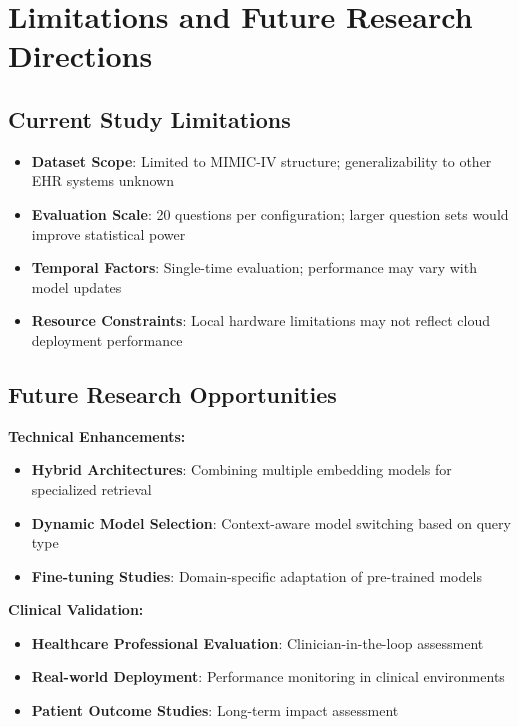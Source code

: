 \section{Limitations and Future Research Directions}

\subsection{Current Study Limitations}

\begin{itemize}
    \item \textbf{Dataset Scope}: Limited to MIMIC-IV structure; generalizability to other EHR systems unknown
    \item \textbf{Evaluation Scale}: 20 questions per configuration; larger question sets would improve statistical power
    \item \textbf{Temporal Factors}: Single-time evaluation; performance may vary with model updates
    \item \textbf{Resource Constraints}: Local hardware limitations may not reflect cloud deployment performance
\end{itemize}

\subsection{Future Research Opportunities}

\textbf{Technical Enhancements:}
\begin{itemize}
    \item \textbf{Hybrid Architectures}: Combining multiple embedding models for specialized retrieval
    \item \textbf{Dynamic Model Selection}: Context-aware model switching based on query type
    \item \textbf{Fine-tuning Studies}: Domain-specific adaptation of pre-trained models
\end{itemize}

\textbf{Clinical Validation:}
\begin{itemize}
    \item \textbf{Healthcare Professional Evaluation}: Clinician-in-the-loop assessment
    \item \textbf{Real-world Deployment}: Performance monitoring in clinical environments
    \item \textbf{Patient Outcome Studies}: Long-term impact assessment
\end{itemize}


